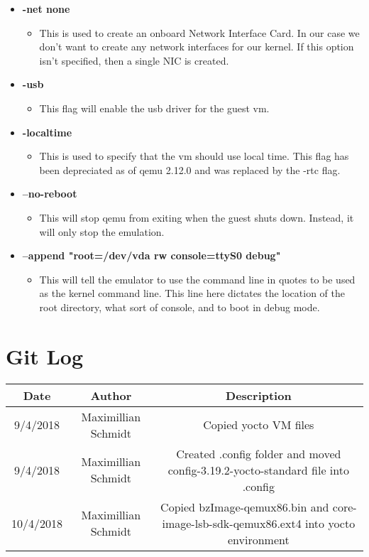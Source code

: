 \documentclass[10pt,onecolumn,draftclsnofoot]{IEEEtran} %
\begin{document}
\begin{singlespace}
\begin{itemize}
    \item \textbf{-net none}
    \begin{itemize}
      \item This is used to create an onboard Network Interface Card. In our case we don’t want to create any network interfaces for our kernel. If this option isn’t specified, then a single NIC is created.
    \end{itemize}

    \item \textbf{-usb}
    \begin{itemize}
      \item This flag will enable the usb driver for the guest vm.
    \end{itemize}

    \item \textbf{-localtime }
    \begin{itemize}
      \item This is used to specify that the vm should use local time. This flag has been depreciated as of qemu 2.12.0 and was replaced by the -rtc flag.
    \end{itemize}

    \item \textbf{--no-reboot}
    \begin{itemize}
      \item This will stop qemu from exiting when the guest shuts down. Instead, it will only stop the emulation.
    \end{itemize}

    \item \textbf{--append "root=/dev/vda rw console=ttyS0 debug"}
    \begin{itemize}
      \item This will tell the emulator to use the command line in quotes to be used as the kernel command line. This line here dictates the location of the root directory, what sort of console, and to boot in debug mode.
    \end{itemize}

  \end{itemize}


\section{\bf Git Log}
 	\begin{center}
 \begin{tabular}{||c c c||} 
 \hline
 Date & Author & Description \\
 \hline
 9/4/2018 & Maximillian Schmidt & Copied yocto VM files \\ 
 \hline
 9/4/2018 & Maximillian Schmidt & Created .config folder and moved config-3.19.2-yocto-standard file into .config \\
 \hline
 10/4/2018 & Maximillian Schmidt & Copied bzImage-qemux86.bin and core-image-lsb-sdk-qemux86.ext4 into yocto environment \\
 \hline
\end{tabular}
	\end{center}


\end{singlespace}
\end{document}
